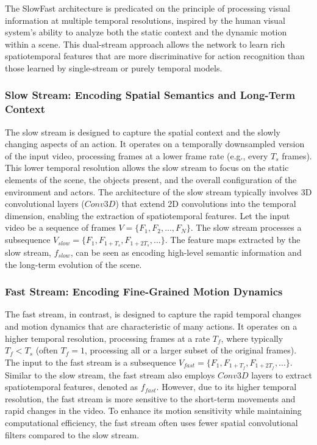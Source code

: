 The SlowFast architecture is predicated on the principle of processing visual information at multiple temporal resolutions, inspired by the human visual system's ability to analyze both the static context and the dynamic motion within a scene. This dual-stream approach allows the network to learn rich spatiotemporal features that are more discriminative for action recognition than those learned by single-stream or purely temporal models.

\subsubsection{Slow Stream: Encoding Spatial Semantics and Long-Term Context}

The slow stream is designed to capture the spatial context and the slowly changing aspects of an action. It operates on a temporally downsampled version of the input video, processing frames at a lower frame rate (e.g., every $T_s$ frames). This lower temporal resolution allows the slow stream to focus on the static elements of the scene, the objects present, and the overall configuration of the environment and actors. The architecture of the slow stream typically involves 3D convolutional layers ($Conv3D$) that extend 2D convolutions into the temporal dimension, enabling the extraction of spatiotemporal features. Let the input video be a sequence of frames $V = \{F_1, F_2, ..., F_N\}$. The slow stream processes a subsequence $V_{slow} = \{F_{1}, F_{1+T_s}, F_{1+2T_s}, ...\}$. The feature maps extracted by the slow stream, $f_{slow}$, can be seen as encoding high-level semantic information and the long-term evolution of the scene.

\subsubsection{Fast Stream: Encoding Fine-Grained Motion Dynamics}

The fast stream, in contrast, is designed to capture the rapid temporal changes and motion dynamics that are characteristic of many actions. It operates on a higher temporal resolution, processing frames at a rate $T_f$, where typically $T_f < T_s$ (often $T_f = 1$, processing all or a larger subset of the original frames). The input to the fast stream is a subsequence $V_{fast} = \{F_{1}, F_{1+T_f}, F_{1+2T_f}, ...\}$. Similar to the slow stream, the fast stream also employs $Conv3D$ layers to extract spatiotemporal features, denoted as $f_{fast}$. However, due to its higher temporal resolution, the fast stream is more sensitive to the short-term movements and rapid changes in the video. To enhance its motion sensitivity while maintaining computational efficiency, the fast stream often uses fewer spatial convolutional filters compared to the slow stream.

